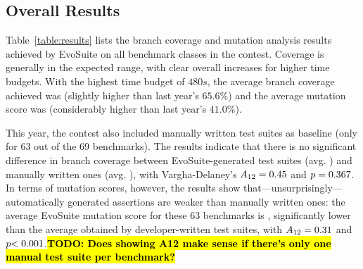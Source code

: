 \documentclass[10pt,conference]{IEEEtran}
\newcommand{\TODO}[1]{\sethlcolor{yellow}\textbf{\textcolor{ScarletRed}{\hl{TODO: #1}}}\xspace}
\newcommand{\TODO}[1]{}
\newcommand{\EVOSUITE}{{\sc EvoSuite}\xspace}
\begin{document}
\begin{table*}[t]
  \centering
  \caption{\label{table:results}Detailed results of \EVOSUITE on the SBST benchmark classes.}
\resizebox{\textwidth}{!}{  

}	
\end{table*}

% 

% 

\subsection{Overall Results}

Table~\ref{table:results} lists the branch coverage and mutation
analysis results achieved by \EVOSUITE on all benchmark classes in the
contest. Coverage is generally in the expected range, with clear
overall increases for higher time budgets. With the highest time
budget of $480s$, the
average branch coverage achieved was \AvgCovG (slightly higher than
last year's $65.6\%$) and the average mutation score was \AvgMutG
(considerably higher than last year's $41.0\%$).

This year, the contest also included manually written test suites as
baseline (only for 63 out of the 69 benchmarks). The results indicate
that there is no significant difference in branch coverage between
\EVOSUITE-generated test suites (avg. \AvgCovEvosuite) and manually
written ones (avg. \AvgCovManual), with Vargha-Delaney's
$A_{12}={0.45}$ and $p={{0.367}}$. In terms of mutation
scores, however, the results show
that---unsurprisingly---automatically generated assertions are weaker
than manually written ones: the average \EVOSUITE mutation score for
these 63 benchmarks is \AvgMutEvosuite, significantly lower than the
average \AvgMutManual obtained by developer-written test suites, with
$A_{12}={0.31}$ and $p{<0.001}$.\TODO{Does showing A12 make
  sense if there's only one manual test suite per benchmark?}
\end{document}
